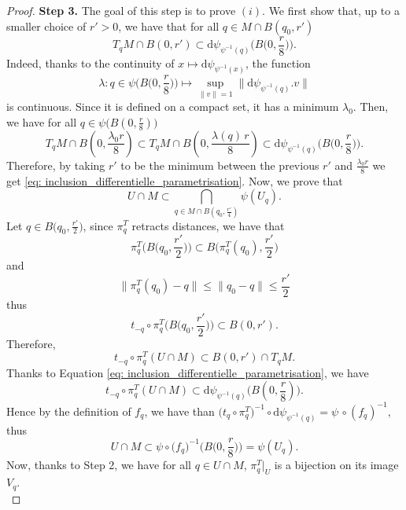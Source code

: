 \documentclass[11pt,reqno,a4paper]{article}%
\theoremstyle{definition}
\theoremstyle{remark}
\renewcommand{\leq}{\leqslant}
\renewcommand{\d}{\mathrm{d}}
\renewcommand{\d}{\mathrm{d}}
\begin{document}
\begin{proof}
    \noindent \textbf{Step 3.} The goal of this step is to prove $(i)$.
    We first show that, up to a smaller choice of $r'>0$, we have that for all $q \in M \cap B(q_0,r')$
    \begin{equation} \label{eq: inclusion_differentielle_parametrisation}
        T_{q} M \cap B(0,r') \subset  \d \psi_{\psi^{-1}(q)} \Big( B\big(0,\frac{r}{8}\big) \Big).
    \end{equation}
    Indeed, thanks to the continuity of $x \mapsto  \d \psi_{\psi^{-1}(x)}$, the function
    \[ \lambda : q \in  \psi\big(B\big(0,\frac{r}{8}\big)\big) \mapsto \underset{\|v\| = 1}{\sup} \|  \d \psi_{\psi^{-1}(q)} .v  \|\]
    is continuous. 
    Since it is defined on a compact set, it has a minimum $\lambda_0$.
    Then, we have for all $q \in \psi\big(B (0,\frac{r}{8})\big)$
    \[   T_{q} M \cap B(0,\frac{\lambda_0 r }{8}) \subset  T_{q} M \cap B(0,\frac{\lambda(q) \, r }{8}) \subset \d \psi_{\psi^{-1}(q)} \Big( B\big(0,\frac{r}{8}\big) \Big).\]
    Therefore, by taking $r'$ to be the minimum between the previous $r'$ and $\frac{\lambda_0 r }{8}$ we get \eqref{eq: inclusion_differentielle_parametrisation}.
    Now, we prove that
    \[ U \cap M \subset \underset{q \in  M \cap B(q_0,\frac{r'}{4})}{\bigcap} \psi(U_{q}).\]
    Let $q \in B\big(q_0, \frac{r'}{2}\big)$, since $\pi_q^T$ retracts distances, we have that
    $$  \pi^T_{q} \Big(  B\Big(q_0, \frac{r'}{2}\Big) \Big) \subset  B\Big( \pi_q^T(q_0), \frac{r'}{2}\Big)$$
    and
    $$ \| \pi_q^T (q_0) - q \| \leq \| q_0 - q \| \leq \frac{r'}{2} $$
    thus
    $$   t_{-q} \circ \pi^T_{q} \Big(  B\Big(q_0, \frac{r'}{2}\Big) \Big) \subset  B( 0 , r').$$
    Therefore,
    $$   t_{-q} \circ \pi^T_{q} ( U \cap M )  \subset B(0 , r') \cap T_q M.$$
    Thanks to Equation \eqref{eq: inclusion_differentielle_parametrisation}, we have
    \[   t_{-q} \circ \pi^T_{q} (U \cap M)  \subset \d \psi_{\psi^{-1}(q)} \big( B(0,\frac{r}{8}) \big) .\]
    Hence by the definition of $f_q$, we have than $ \big( t_q \circ \pi_q^T) ^{-1} \circ \d \psi_{\psi^{-1}(q)} = \psi \, \circ (f_q)^{-1}$, thus
    \[U \cap M \subset \psi \circ \big( f_{q} \big)^{-1} \Big( B\big(0,\frac{r}{8}\big) \Big)  = \psi (U_{q}).\]
    Now, thanks to Step 2, we have for all $q \in U \cap M$, $\pi_{q}^T |_U$ is a bijection on its image $V_{q}$. \\


\end{proof}
\end{document}
